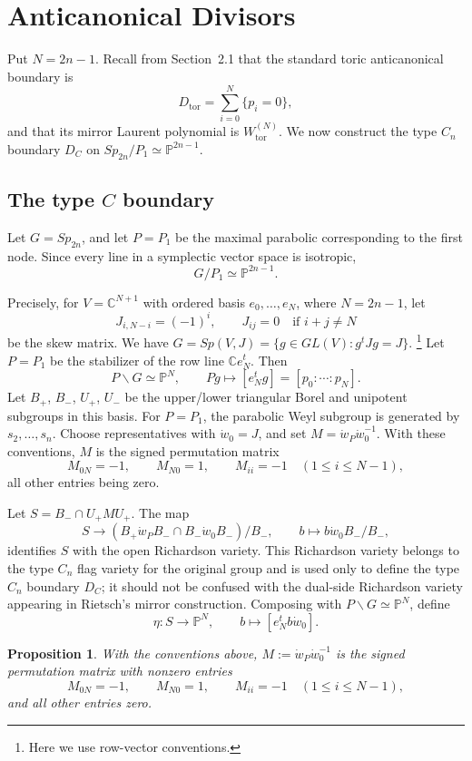 \documentclass{article}
\newtheorem{prop}[thm]{Proposition}
\newcommand{\CC}{\mathbb{C}}
\newcommand{\PP}{\mathbb{P}}
\begin{document}
\section{Anticanonical Divisors}
Put \(N=2n-1\). Recall from Section~2.1 that the standard toric anticanonical boundary is
\[
D_{\mathrm{tor}}=\sum_{i=0}^{N}\{p_i=0\},
\]
and that its mirror Laurent polynomial is \(W_{\mathrm{tor}}^{(N)}\). We now construct the type \(C_n\) boundary \(D_C\) on \(Sp_{2n}/P_1\simeq\PP^{2n-1}\).

\subsection{The type \(C\) boundary}
Let \(G=Sp_{2n}\), and let \(P=P_1\) be the maximal parabolic corresponding to the first node. Since every line in a symplectic vector space is isotropic,
\[
G/P_1\simeq\PP^{2n-1}.
\]

Precisely, for \(V=\CC^{N+1}\) with ordered basis \(e_0,\ldots,e_N\), where \(N=2n-1\), let
\[
J_{i,N-i}=(-1)^i,
\qquad
J_{ij}=0\quad\text{if }i+j\ne N
\]
be the skew matrix.
We have \(G=Sp(V,J)=\{g\in GL(V):g^tJg=J\}\). \footnote{Here we use row-vector conventions.} Let \(P=P_1\) be the stabilizer of the row line \(\CC e_N^t\). Then
\[
P\backslash G\simeq \PP^N,
\qquad
Pg\longmapsto [e_N^tg]=[p_0:\cdots:p_N].
\]
Let \(B_+\), \(B_-\), \(U_+\), \(U_-\) be the upper/lower triangular Borel and unipotent subgroups in this basis. For \(P=P_1\), the parabolic Weyl subgroup is generated by \(s_2,\ldots,s_n\). Choose representatives with \(\dot w_0=J\), and set \(M=\dot w_P\dot w_0^{-1}\). With these conventions, \(M\) is the signed permutation matrix
\[
M_{0N}=-1,
\qquad
M_{N0}=1,
\qquad
M_{ii}=-1\quad(1\le i\le N-1),
\]
all other entries being zero.

Let \(S=B_-\cap U_+MU_+\). The map
\[
S\longrightarrow (B_+\dot w_PB_-\cap B_-\dot w_0B_-)/B_-,
\qquad
b\longmapsto b\dot w_0B_-/B_-,
\]
identifies \(S\) with the open Richardson variety. This Richardson variety belongs to the type \(C_n\) flag variety for the original group and is used only to define the type \(C_n\) boundary \(D_C\); it should not be confused with the dual-side Richardson variety appearing in Rietsch's mirror construction.
Composing with \(P\backslash G\simeq\PP^N\), define
\[
\eta:S\longrightarrow \PP^N,
\qquad
b\longmapsto [e_N^tb\dot w_0].
\]

\begin{prop}\label{prop:M-matrix}
With the conventions above, \(M:=\dot w_P\dot w_0^{-1}\) is the signed permutation matrix with nonzero entries
\[
M_{0N}=-1,\qquad
M_{N0}=1,\qquad
M_{ii}=-1\quad(1\le i\le N-1),
\]
and all other entries zero.
\end{prop}
\end{document}
